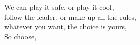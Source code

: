 We can play it safe, or play it cool, \\
follow the leader, or make up all the rules, \\
whatever you want, the choice is yours, \\
So choose,